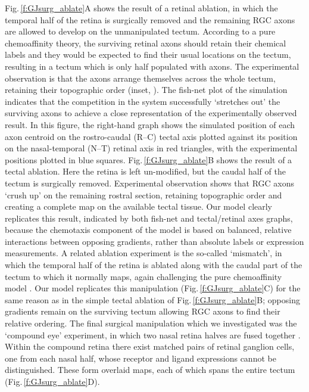 \documentclass[11pt, a4paper]{article}
\begin{document}
Fig.\,\ref{f:GJsurg_ablate}A shows the result of a retinal ablation, in which the temporal half of the retina is surgically removed and the remaining RGC axons are allowed to develop on the unmanipulated tectum.
According to a pure chemoaffinity theory, the surviving retinal axons should retain their chemical labels and they would be expected to find their usual locations on the tectum, resulting in a tectum which is only half populated with axons. 
The experimental observation is that the axons arrange themselves across the whole tectum, retaining their topographic order (inset, \citet{attardi_preferential_1963,schmidt_expansion_1978}). 
The fish-net plot of the simulation indicates that the competition in the system successfully `stretches out' the surviving axons to achieve a close representation of the experimentally observed result. 
In this figure, the right-hand graph shows the simulated position of each axon centroid on the rostro-caudal (R--C) tectal axis plotted against its position on the nasal-temporal (N--T) retinal axis in red triangles, with the experimental positions plotted in blue squares.
%
Fig.\,\ref{f:GJsurg_ablate}B shows the result of a tectal ablation. Here the retina is left un-modified, but the caudal half of the tectum is surgically removed. Experimental observation \citep{yoon_reorganization_1971,sharma_reformation_1972} shows that RGC axons `crush up' on the remaining rostral section, retaining topographic order and creating a complete map on the available tectal tissue. Our model clearly replicates this result, indicated by both fish-net and tectal/retinal axes graphs, because the chemotaxis component of the model is based on balanced, relative interactions between opposing gradients, rather than absolute labels or expression measurements.
%
A related ablation experiment is the so-called `mismatch', in which the temporal half of the retina is ablated along with the caudal part of the tectum to which it normally maps, again challenging the pure chemoaffinity model \citep{horder_retention_1971}. Our model replicates this manipulation (Fig.\,\ref{f:GJsurg_ablate}C) for the same reason as in the simple tectal ablation of Fig.\,\ref{f:GJsurg_ablate}B; opposing gradients remain on the surviving tectum allowing RGC axons to find their relative ordering.
%
The final surgical manipulation which we investigated was the `compound eye' experiment, in which two nasal retina halves are fused together \citep{gaze_retino-tectal_1963,fawcett_retinotectal_1982}. Within the compound retina there exist matched pairs of retinal ganglion cells, one from each nasal half, whose receptor and ligand expressions cannot be distinguished. These form overlaid maps, each of which spans the entire tectum (Fig.\,\ref{f:GJsurg_ablate}D).
\end{document}
